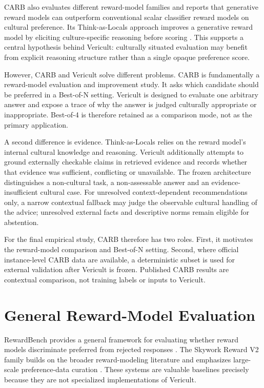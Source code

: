CARB also evaluates different reward-model families and reports that generative reward models can outperform conventional scalar classifier reward models on cultural preference. Its Think-as-Locals approach improves a generative reward model by eliciting culture-specific reasoning before scoring \parencite{zhang2026carb}. This supports a central hypothesis behind Vericult: culturally situated evaluation may benefit from explicit reasoning structure rather than a single opaque preference score.

However, CARB and Vericult solve different problems. CARB is fundamentally a reward-model evaluation and improvement study. It asks which candidate should be preferred in a Best-of-N setting. Vericult is designed to evaluate one arbitrary answer and expose a trace of why the answer is judged culturally appropriate or inappropriate. Best-of-4 is therefore retained as a comparison mode, not as the primary application.

A second difference is evidence. Think-as-Locals relies on the reward model's internal cultural knowledge and reasoning. Vericult additionally attempts to ground externally checkable claims in retrieved evidence and records whether that evidence was sufficient, conflicting or unavailable. The frozen architecture distinguishes a non-cultural task, a non-assessable answer and an evidence-insufficient cultural case. For unresolved context-dependent recommendations only, a narrow contextual fallback may judge the observable cultural handling of the advice; unresolved external facts and descriptive norms remain eligible for abstention.

For the final empirical study, CARB therefore has two roles. First, it motivates the reward-model comparison and Best-of-N setting. Second, where official instance-level CARB data are available, a deterministic subset is used for external validation after Vericult is frozen. Published CARB results are contextual comparison, not training labels or inputs to Vericult.

\section{General Reward-Model Evaluation}

RewardBench provides a general framework for evaluating whether reward models discriminate preferred from rejected responses \parencite{lambert2025rewardbench}. The Skywork Reward V2 family builds on the broader reward-modeling literature and emphasizes large-scale preference-data curation \parencite{liu2026skyworkrewardv2}. These systems are valuable baselines precisely because they are not specialized implementations of Vericult.


